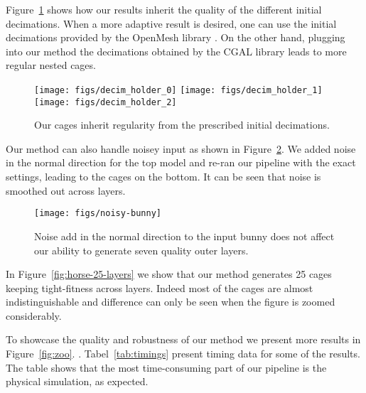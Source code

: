 Figure~\ref{fig:decimations} shows how our results inherit the quality
of the different initial decimations. When a more adaptive result is desired,
one can use the initial decimations provided by the OpenMesh library \cite{openmesh}. 
On the other hand, plugging into our method the decimations obtained by the CGAL
library \cite{cgal} leads to more regular nested cages.

\begin{figure}
  \texttt{[image: figs/decim\_holder\_0]}
    \texttt{[image: figs/decim\_holder\_1]}
      \texttt{[image: figs/decim\_holder\_2]}
  \caption{Our cages inherit regularity from the prescribed initial decimations. 
  }
  \label{fig:decimations}
\end{figure}

Our method can also handle noisey input as shown in Figure~\ref{fig:noisy-bunny}.
We added noise in the normal direction for the top model and 
re-ran our pipeline with the exact settings, leading to the cages on the bottom.
It can be seen that noise is smoothed out across layers. 

\begin{figure}
  \texttt{[image: figs/noisy-bunny]}
  \caption{Noise add in the normal direction to the input bunny does not
  affect our ability to generate seven quality outer layers.}
  \label{fig:noisy-bunny}
\end{figure}

In Figure~\ref{fig:horse-25-layers} we show that our method generates
25 cages keeping tight-fitness across layers. Indeed most of the cages
are almost indistinguishable and difference can only be seen when
the figure is zoomed considerably. 

To showcase the quality and robustness of our method we present more results 
in Figure~\ref{fig:zoo}. .
Tabel~\ref{tab:timings} present timing data for some of the results. The table shows
that the most time-consuming part of our pipeline is the physical simulation, as expected.


